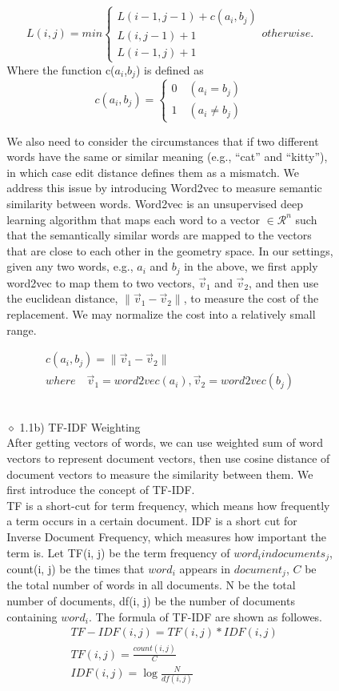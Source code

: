 \documentclass[10pt]{article}
\begin{document}
\begin{itemize}
\begin{itemize}
\begin{itemize}
\begin{itemize}
$$
L(i, j) = min
\left\{
\begin{array}{ll}
L(i-1, j-1) + c(a_i,b_j) \\
L(i, j-1) +1 \\
L(i-1, j) +1
\end{array}
\right.
otherwise.
$$
Where the function c($a_i$,$b_j$) is defined as
$$
c(a_i, b_j)=
\left\{
\begin{array}{ll}
0 \quad (a_i = b_j) \\
1 \quad (a_i \neq b_j)
\end{array}
\right.
$$

We also need to consider the circumstances that if two different words have the same or similar meaning (e.g., “cat” and “kitty”), in which case edit distance defines them as a mismatch. We address this issue by introducing Word2vec to measure semantic similarity between words. 
Word2vec is an unsupervised  deep learning algorithm that maps each word to a vector  $\in \mathcal{R}^n$ such that the semantically similar words are mapped to the vectors that are close to each other in the geometry space. 
In our settings, given any two words, e.g.,  $a_i$ and $b_j$ in the above, we first apply word2vec to map them to two vectors, $\vec{v}_1$ and $\vec{v}_2$, and then use the euclidean distance, $\lVert \vec{v}_1 - \vec{v}_2 \rVert$, to measure the cost of the replacement.
We may normalize the cost into a relatively small range. 

$$
\begin{array}{c}
c(a_i, b_j)=\lVert \vec{v}_1 - \vec{v}_2 \rVert \\
 where \quad  \vec{v}_1 = word2vec(a_i), \vec{v}_2=word2vec(b_j)
\end{array}
$$
\\
\item[$\diamond$]{1.1b) TF-IDF Weighting}\\
After getting vectors of words, we can use weighted sum of word vectors to represent document vectors, then use cosine distance of document vectors to measure the similarity between them. We first introduce the concept of TF-IDF.\\

TF is a short-cut for term frequency, which means how frequently a term occurs in a certain document. IDF is a short cut for Inverse Document Frequency, which measures how important the term is. Let TF(i, j) be the term frequency of $word_i in documents_j$, count(i, j) be the times that $word_i$ appears in $document_j$, $C$ be the total number of words in all documents. N be the total number of documents, df(i, j) be the number of documents containing $word_i$. The formula of TF-IDF are shown as followes.
  \begin{align*}
  	& TF-IDF(i, j) = TF(i, j) * IDF(i, j)\\
	& TF(i, j) = \frac{count(i, j)}{C}\\
	& IDF(i, j) = \log \frac{N}{df(i, j)}
  \end{align*}


\end{itemize}
\end{itemize}
\end{itemize}
\end{itemize}
\end{document}
